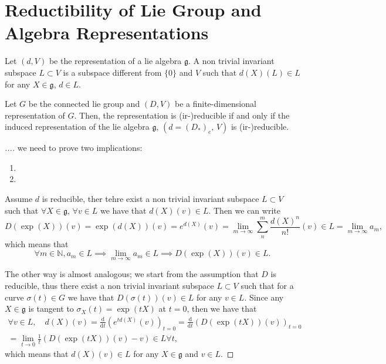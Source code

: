 \section{Reductibility of Lie Group and Algebra Representations}

\begin{definition}
    Let \((d,V)\) be the representation of a lie algebra \(\mathfrak{g}\). A non trivial invariant subspace \(L \subset V\) is a subspace different from \(\{0\}\) and \(V\) such that \(d(X)(L) \in L\) for any \(X \in \mathfrak{g}\), \(d \in L\).
\end{definition}

\begin{proposition}
    Let \(G\) be the connected lie group and \((D, V)\) be a finite-dimensional representation of \(G\). Then, the representation is (ir-)reducible if and only if the induced representation of the lie algebra \(\mathfrak{g}\), \((d=(D_*)_e,\,V)\)  is (ir-)reducible.
\end{proposition}
\begin{proof}
    [...] we need to prove two implications:
    \begin{enumerate}
        \item [...]
        \item [...]
    \end{enumerate}
    Assume \(d\) is reducible, ther tehre exist a non trivial invariant subspace \(L \subset V\) such that \(\forall X \in \mathfrak{g}\), \(\forall v \in L\) we have that \(d(X)(v) \in L\). Then we can write
    \[
        D(\exp(X))(v) = \exp(d(X))(v) = e^{d(X)}(v) = \lim_{m \to \infty} \sum_{n}^m \frac{d(X)^n}{n!}(v) \in L = \lim_{m \to \infty} a_m,
    \]
    which means that
    \[
        \forall m \in \mathbb{N}, a_m \in L \implies \lim_{m \to \infty} a_m \in L \implies D(\exp(X))(v) \in L.
    \]

    The other way is almost analogous; we start from the assumption that \(D\) is reducible, thus there exist a non trivial invariant subspace \(L \subset V\) such that for a curve \(\sigma(t) \in G\) we have that \(D(\sigma(t))(v) \in L\) for any \(v \in L\). Since any \(X \in \mathfrak{g}\) is tangent to \(\sigma_X(t) = \exp(tX)\) at \(t=0\), then we have that
    \[
        \begin{aligned}
            \forall v \in L, \quad d(X)(v) = \frac{\mathrm{d}}{\mathrm{d} t} \left( e^{t d(X)}(v)\right)_{t=0} = \frac{\mathrm{d}}{\mathrm{d} t} \left( D(\exp(tX))(v)\right)_{t=0} \\
            = \lim_{t \to 0} \frac{1}{t} \left( D(\exp(tX))(v) - v \right) \in L \forall t,
        \end{aligned}
    \]
    which means that \(d(X)(v) \in L\) for any \(X \in \mathfrak{g}\) and \(v \in L\).
\end{proof}

